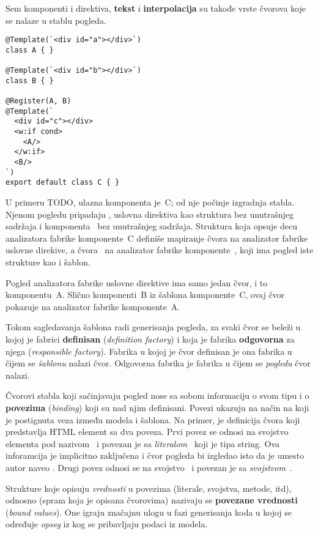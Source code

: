 Sem komponenti i direktiva, \textbf{tekst} i \textbf{interpolacija} su takođe vrste čvorova koje se nalaze u stablu pogleda.

\begin{verbatim}
@Template(`<div id="a"></div>`)
class A { }

@Template(`<div id="b"></div>`)
class B { }

@Register(A, B)
@Template(`
  <div id="c"></div>
  <w:if cond>
    <A/>
  </w:if>
  <B/>
`)
export default class C { }
\end{verbatim}

U primeru TODO, ulazna komponenta je~\code C; od nje počinje izgradnja stabla.
Njenom pogledu pripadaju , uslovna direktiva  kao struktura bez unutrašnjeg sadržaja i komponenta~ bez unutrašnjeg sadržaja.
Struktura koja opsuje decu analizatora fabrike komponente~\code C definiše mapiranje čvora  na analizator fabrike uslovne direkive, a čvora~ na analizator fabrike komponente~, koji ima pogled iste strukture kao i šablon.

Pogled analizatora fabrike uslovne direktive  ima samo jedan čvor, i to komponentu~\code A.
Slično komponenti~\code B iz šablona komponente~\code C, ovaj čvor pokazuje na analizator fabrike komponente~\code A.

Tokom sagledavanja šablona radi generisanja pogleda, za svaki čvor se beleži u kojoj je fabrici \textbf{definisan} (\textsl{definition factory}) i koja je fabrika \textbf{odgovorna} za njega (\textsl{responsible factory}).
Fabrika u kojoj je čvor definisan je ona fabrika u čijem se \textit{šablonu} nalazi čvor.
Odgovorna fabrika je fabrika u čijem se \textit{pogledu} čvor nalazi.

Čvorovi stabla koji sačinjavaju pogled nose sa sobom informaciju o svom tipu i o \textbf{povezima} (\textsl{binding}) koji su nad njim definisani.
Povezi ukazuju na način na koji je postignuta veza između modela i šablona.
Na primer,  je definicija čvora koji predstavlja HTML element sa dva poveza.
Prvi povez se odnosi na svojstvo elementa pod nazivom~ i povezan je sa \textit{literalom}~ koji je tipa string.
Ova inforamcija je implicitno zaključena i čvor pogleda bi izgledao isto da je umesto  autor naveo .
Drugi povez odnosi se na svojstvo~ i povezan je sa \textit{svojstvom}~.

Strukture koje opisuju \emph{vrednosti} u povezima (literale, svojstva, metode, itd), odnosno  (spram  koja je opisana čvorovima) nazivaju se \textbf{povezane vrednosti} (\textsl{bound values}).
One igraju značajnu ulogu u fazi generisanja koda u kojoj se određuje \textit{opseg} iz kog se pribavljaju podaci iz modela.

